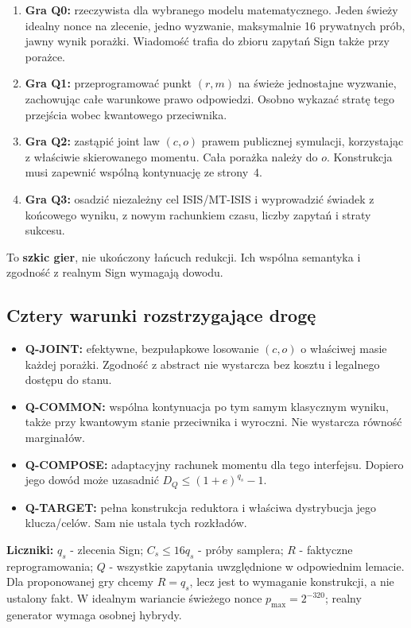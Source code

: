 \documentclass[10pt,a4paper]{article}
\newcommand{\code}[1]{\texttt{\detokenize{#1}}}
\newcommand{\subhead}[1]{\subsection*{\color{ink}\sffamily #1}}
\begin{document}
\begin{enumerate}
\item \textbf{Gra Q0:} rzeczywista dla wybranego modelu matematycznego. Jeden świeży idealny nonce na zlecenie, jedno wyzwanie, maksymalnie 16 prywatnych prób, jawny wynik porażki. Wiadomość trafia do zbioru zapytań Sign także przy porażce.
\item \textbf{Gra Q1:} przeprogramować punkt $(r,m)$ na świeże jednostajne wyzwanie, zachowując całe warunkowe prawo odpowiedzi. Osobno wykazać stratę tego przejścia wobec kwantowego przeciwnika.
\item \textbf{Gra Q2:} zastąpić joint law $(c,o)$ prawem publicznej symulacji, korzystając z właściwie skierowanego momentu. Cała porażka należy do $o$. Konstrukcja musi zapewnić wspólną kontynuację ze strony~4.
\item \textbf{Gra Q3:} osadzić niezależny cel ISIS/MT-ISIS i wyprowadzić świadek z końcowego wyniku, z nowym rachunkiem czasu, liczby zapytań i straty sukcesu.
\end{enumerate}
To \textbf{szkic gier}, nie ukończony łańcuch redukcji. Ich wspólna semantyka i zgodność z realnym Sign wymagają dowodu.

\subhead{Cztery warunki rozstrzygające drogę}
\begin{itemize}
\item \textbf{Q-JOINT:} efektywne, bezpułapkowe losowanie $(c,o)$ o właściwej masie każdej porażki. Zgodność z abstract \code{Sampler} nie wystarcza bez kosztu i legalnego dostępu do stanu.
\item \textbf{Q-COMMON:} wspólna kontynuacja po tym samym klasycznym wyniku, także przy kwantowym stanie przeciwnika i wyroczni. Nie wystarcza równość marginałów.
\item \textbf{Q-COMPOSE:} adaptacyjny rachunek momentu dla tego interfejsu. Dopiero jego dowód może uzasadnić $D_Q\le(1+e)^{q_s}-1$.
\item \textbf{Q-TARGET:} pełna konstrukcja reduktora i właściwa dystrybucja jego klucza/celów. Sam \code{accepted_extracts} nie ustala tych rozkładów.
\end{itemize}

\textbf{Liczniki:} $q_s$ - zlecenia Sign; $C_s\le16q_s$ - próby samplera; $R$ - faktyczne reprogramowania; $Q$ - wszystkie zapytania uwzględnione w odpowiednim lemacie. Dla proponowanej gry chcemy $R=q_s$, lecz jest to wymaganie konstrukcji, a nie ustalony fakt. W idealnym wariancie świeżego nonce $p_{\max}=2^{-320}$; realny generator wymaga osobnej hybrydy.
\end{document}
